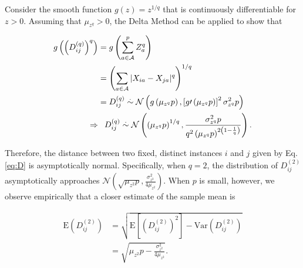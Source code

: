 \documentclass[10pt,letterpaper]{article}\usepackage[]{graphicx}\usepackage[]{color}
\begin{document}
Consider the smooth function $g(z) = z^{1/q}$ that is continuously differentiable for $z>0$. Assuming that $\mu_{z^q}>0$, the Delta Method \cite{allStats} can be applied to show that 

\begin{equation}\label{eq:DqDeltaMethod}
\begin{aligned}
g\left(\left(D^{(q)}_{ij}\right)^q\right) &= g\left(\displaystyle \sum_{a \in \mathcal{A}}^{p}Z^q_a\right) \\
&= \left(\sum_{a \in \mathcal{A}} |X_{ia} - X_{ja}|^q\right)^{1/q} \\
&= D^{(q)}_{ij} \overset{.}{\sim} \mathcal{N}\left(g\left(\mu_{z^q}p\right),\left[g\prime \left(\mu_{z^q}p\right)\right]^2\sigma^2_{z^q}p\right) \\
\Rightarrow &\hphantom{=} D^{(q)}_{ij} \overset{.}{\sim} \mathcal{N}\left(\left(\mu_{z^q}p\right)^{1/q},\frac{\sigma^2_{z^q}p}{q^2\left(\mu_{z^q}p\right)^{2\left(1 - \frac{1}{q}\right)}}\right).
\end{aligned}
\end{equation}

Therefore, the distance between two fixed, distinct instances $i$ and $j$ given by Eq. \ref{eq:D} is asymptotically normal.
Specifically, when $q = 2$, the distribution of $D_{ij}^{(2)}$ asymptotically approaches $\mathcal{N}\left(\sqrt{\mu_{z^2}p}, \frac{\sigma^2_{z^2}}{4\mu_{z^2}}\right)$. 
When $p$ is small, however, we observe empirically that a closer estimate of the sample mean is 

\begin{equation}\label{eq:DqImprovedExplained}
\begin{aligned}
\text{E}\left(D^{(2)}_{ij}\right) &= \sqrt{\text{E}\left[\left(D^{(2)}_{ij}\right)^2\right] - \text{Var}\left(D^{(2)}_{ij}\right)} \\
&= \sqrt{\mu_{z^2}p - \frac{\sigma^2_{z^2}}{4\mu_{z^2}}}.
\end{aligned}
\end{equation}
\end{document}

